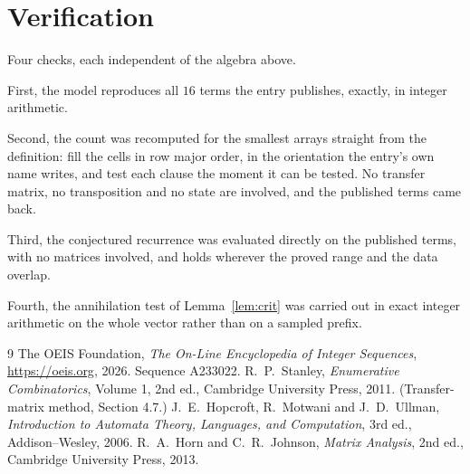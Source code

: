 \documentclass[11pt,a4paper]{article}
\theoremstyle{plain}
\theoremstyle{definition}
\begin{document}
\section{Verification}

Four checks, each independent of the algebra above.

First, the model reproduces all $16$ terms the entry publishes, exactly, in integer
arithmetic.

Second, the count was recomputed for the smallest arrays straight from the definition: fill the
cells in row major order, in the orientation the entry's own name writes, and test each clause
the moment it can be tested. No transfer matrix, no transposition and no state are involved,
and the published terms came back.

Third, the conjectured recurrence was evaluated directly on the published terms, with no
matrices involved, and holds wherever the proved range and the data overlap.

Fourth, the annihilation test of Lemma~\ref{lem:crit} was carried out in exact integer
arithmetic on the whole vector rather than on a sampled prefix.

\begin{thebibliography}{9}
 The OEIS Foundation, \emph{The On-Line Encyclopedia of Integer
Sequences}, \url{https://oeis.org}, 2026. Sequence A233022.
 R.~P.~Stanley, \emph{Enumerative Combinatorics}, Volume 1, 2nd ed.,
Cambridge University Press, 2011. (Transfer-matrix method, Section 4.7.)
 J.~E.~Hopcroft, R.~Motwani and J.~D.~Ullman, \emph{Introduction to Automata
Theory, Languages, and Computation}, 3rd ed., Addison--Wesley, 2006.
 R.~A.~Horn and C.~R.~Johnson, \emph{Matrix Analysis}, 2nd ed., Cambridge
University Press, 2013.
\end{thebibliography}
\end{document}
